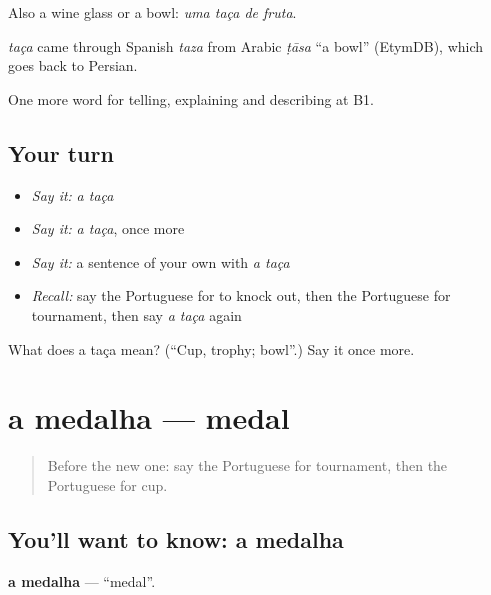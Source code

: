 Also a wine glass or a bowl: \emph{uma taça de fruta}.

\begin{cousinweb}
\emph{taça} came through Spanish \emph{taza} from Arabic \emph{ṭāsa} \textquotedblleft{}a bowl\textquotedblright{} (EtymDB), which goes back to Persian.
\end{cousinweb}

\begin{grammarlens}[title={What you've built}]
One more word for telling, explaining and describing at B1.
\end{grammarlens}

\subsection*{Your turn}
\begin{itemize}
\raggedright
  \item \emph{Say it:} \emph{a taça}
  \item \emph{Say it:} \emph{a taça}, once more
  \item \emph{Say it:} a sentence of your own with \emph{a taça}
  \item \emph{Recall:} say the Portuguese for to knock out, then the Portuguese for tournament, then say \emph{a taça} again
\end{itemize}

\begin{tcolorbox}[breakable,colback=teal!4,colframe=teal!35!black,title={Before you move on}]
What does a taça mean? (\textquotedblleft{}Cup, trophy; bowl\textquotedblright{}.) Say it once more.
\end{tcolorbox}
\section[a medalha]{a medalha — medal}

\label{lesson:PT-C511-medalha}



\begin{quote}
Before the new one: say the Portuguese for tournament, then the Portuguese for cup.
\end{quote}

\subsection*{You'll want to know: a medalha}
\textbf{a medalha} — \textquotedblleft{}medal\textquotedblright{}.

